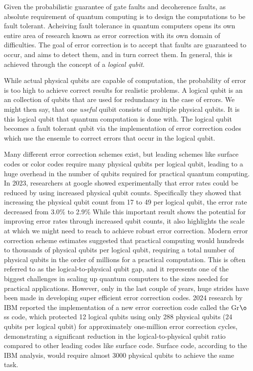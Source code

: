 \documentclass{elbioimp2}
\begin{document}
Given the probabilistic guarantee of gate faults and decoherence faults, as absolute requirement of quantum computing is to design the computations to be fault tolerant.
Acheiving fault tolerance in quantum computers opens its own entire area of research known as error correction with its own domain of difficulties.
The goal of error correction is to accept that faults are guaranteed to occur, and aims to detect them, and in turn correct them.
In general, this is achieved through the concept of a \textit{logical qubit}.

While actual physical qubits are capable of computation,
the probability of error is too high to achieve correct results for realistic problems. A logical qubit is an an {collection} of qubits that are used
for redundancy in the case of errors. We might then say, that one \textit{useful} quibit consists of multiple physical qubits. It is this logical qubit that quantum
computation is done with. The logical qubit becomes a fault tolerant qubit via the implementation of error correction codes which use the ensemle to correct errors that
occur in the logical qubit.

Many different error correction schemes exist, but leading schemes like surface codes or color codes require many physical qubits per logical qubit, leading to a huge overhead in the number of qubits required for practical quantum computing. In 2023, researchers at google showed experimentally that error rates could be reduced by using increased physical qubit counts\cite{GoogleQAI2023}. Specifically they showed that increasing the physical qubit count from 17 to 49 per logical qubit, the error rate decreased from 3.0\% to 2.9\% While this important result shows the potential for improving error rates through increased qubit counts, it also highlights the scale at which we might need to reach to achieve robust error correction. Modern error correction scheme estimates suggested that practical computing would hundreds to thousands of physical qubits per logical qubit, requiring a total number of physical qubits in the order of millions for a practical computation. This is often referred to as the logical-to-physical qubit gap, and it represents one of the biggest challenges in scaling up quantum computers to the sizes needed for practical applications. However, only in the last couple of years, huge strides have been made in developing super efficient error correction codes. 2024 research by  IBM reported the implementation of a new error correction code called the Gr$\o$ss code, which protected 12 logical qubits using only 288 physical qubits (24 qubits per logical qubit) for approximately one-million error correction cycles, demonstrating a significant reduction in the logical-to-physical qubit ratio\cite{FTQM2024} compared to other leading codes like surface code. Surface code, according to the IBM analysis, would require almost 3000 physical qubits to achieve the same task. 
\end{document}

